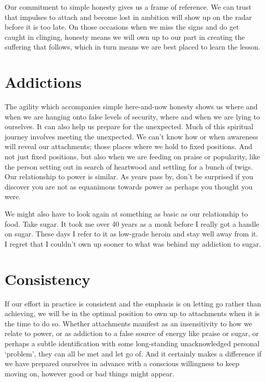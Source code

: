Our commitment to simple honesty gives us a frame of reference. We can
trust that impulses to attach and become lost in ambition will show up
on the radar before it is too late. On those occasions when we miss the
signs and do get caught in clinging, honesty means we will own up to our
part in creating the suffering that follows, which in turn means we are
best placed to learn the lesson.

\section{Addictions}

The agility which accompanies simple here-and-now honesty shows us
where and when we are hanging onto false levels of security, where and
when we are lying to ourselves. It can also help us prepare for the
unexpected. Much of this spiritual journey involves meeting the
unexpected. We can’t know how or when awareness will reveal our
attachments; those places where we hold to fixed positions. And not just
fixed positions, but also when we are feeding on praise or popularity,
like the person setting out in search of heartwood and settling for a
bunch of twigs. Our relationship to power is similar. As years pass by,
don’t be surprised if you discover you are not as equanimous towards
power as perhaps you thought you were.

We might also have to look again at something as basic as our
relationship to food. Take sugar. It took me over 40 years as a monk
before I really got a handle on sugar. These days I refer to it as
low-grade heroin and stay well away from it. I regret that I couldn’t
own up sooner to what was behind my addiction to sugar.

\section{Consistency}

If our effort in practice is consistent and the emphasis is on letting
go rather than achieving, we will be in the optimal position to own up
to attachments when it is the time to do so. Whether attachments
manifest as an insensitivity to how we relate to power, or as addiction
to a false source of energy like praise or sugar, or perhaps a subtle
identification with some long-standing unacknowledged personal
‘problem’, they can all be met and let go of. And it certainly makes a
difference if we have prepared ourselves in advance with a conscious
willingness to keep moving on, however good or bad things might appear.

